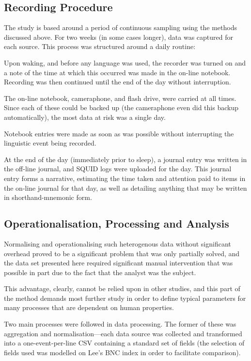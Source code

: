\subsection{Recording Procedure}
\label{sec:personal:recording}
The study is based around a period of continuous sampling using the methods discussed above.  For two weeks (in some cases longer), data was captured for each source.  This process was structured around a daily routine:

Upon waking, and before any language was used, the recorder was turned on and a note of the time at which this occurred was made in the on-line notebook.  Recording was then continued until the end of the day without interruption.

The on-line notebook, cameraphone, and flash drive, were carried at all times.  Since each of these could be backed up (the cameraphone even did this backup automatically), the most data at risk was a single day.

Notebook entries were made as soon as was possible without interrupting the linguistic event being recorded.

At the end of the day (immediately prior to sleep), a journal entry was written in the off-line journal, and SQUID logs were uploaded for the day.  This journal entry forms a narrative, estimating the time taken and attention paid to items in the on-line journal for that day, as well as detailing anything that may be written in shorthand-mnemonic form.










\subsection{Operationalisation, Processing and Analysis}
Normalising and operationalising such heterogenous data without significant overhead proved to be a significant problem that was only partially solved, and the data set presented here required significant manual intervention that was possible in part due to the fact that the analyst was the subject.

This advantage, clearly, cannot be relied upon in other studies, and this part of the method demands most further study in order to define typical parameters for many processes that are dependent on human properties.

Two main processes were followed in data processing.  The former of these was aggregation and normalisation---each data source was collected and transformed into a one-event-per-line CSV containing a standard set of fields (the selection of fields used was modelled on Lee's BNC index in order to facilitate comparison).

